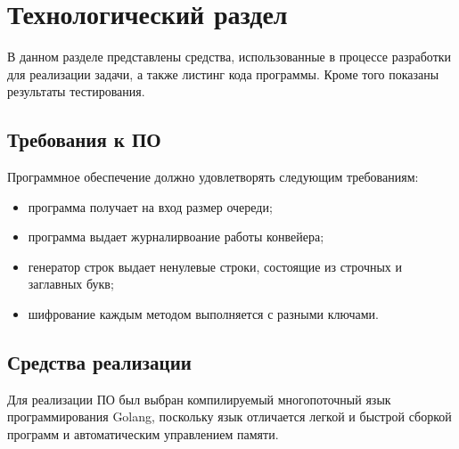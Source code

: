 \chapter{Технологический раздел}
\label{cha:technological}

    В данном разделе представлены средства, использованные в процессе разработки для реализации задачи, а также листинг кода программы. Кроме того показаны результаты тестирования.

    \section{Требования к ПО}
        Программное обеспечение должно удовлетворять следующим требованиям:
        \begin{itemize}
            \item программа получает на вход размер очереди;
            \item программа выдает журналирвоание работы конвейера;
            \item генератор строк выдает ненулевые строки, состоящие из строчных и заглавных букв;
            \item шифрование каждым методом выполняется с разными ключами.
        \end{itemize}
    \section{Средства реализации}
        Для реализации ПО был выбран компилируемый многопоточный язык программирования Golang, поскольку язык отличается легкой и быстрой сборкой программ и автоматическим управлением памяти.

